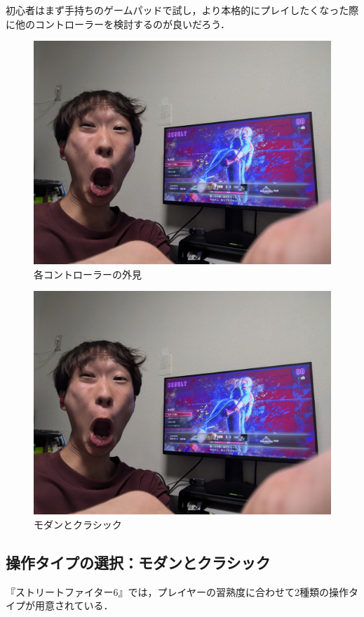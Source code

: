 \documentclass[twocolumn, a4paper]{Zemiresume}
\begin{document}
初心者はまず手持ちのゲームパッドで試し，より本格的にプレイしたくなった際に他のコントローラーを検討するのが良いだろう．

\begin{figure}[t]
  \centering
  \includegraphics[width=\columnwidth]{img/SF6_Master.jpg}
  \caption{各コントローラーの外見}\label{fig:sf6_master}
\end{figure}

\begin{figure}[t]
  \centering
  \includegraphics[width=\columnwidth]{img/SF6_Master.jpg}
  \caption{モダンとクラシック}\label{fig:sf6_master}
\end{figure}


\subsection{操作タイプの選択：モダンとクラシック}
『ストリートファイター6』では，プレイヤーの習熟度に合わせて2種類の操作タイプが用意されている．
\end{document}

